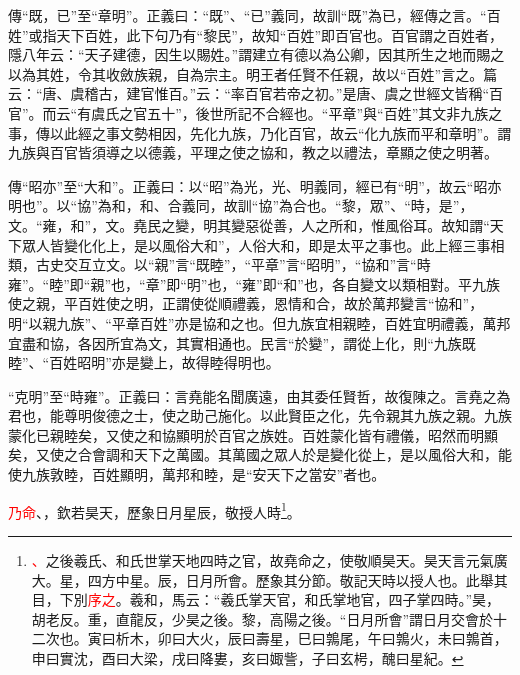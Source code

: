 {\noindent\zhuan{}\fzbyks 傳“既，已”至“章明”。正義曰：“既”、“已”義同，故訓“既”為已，經傳之言。“百姓”或指天下百姓，此下句乃有“黎民”，故知“百姓”即百官也。百官謂之百姓者，隱八年云：“天子建德，因生以賜姓。”謂建立有德以為公卿，因其所生之地而賜之以為其姓，令其收斂族親，自為宗主。明王者任賢不任親，故以“百姓”言之。篇云：“唐、虞稽古，建官惟百。”云：“率百官若帝之初。”是唐、虞之世經文皆稱“百官”。而云“有虞氏之官五十”，後世所記不合經也。“平章”與“百姓”其文非九族之事，傳以此經之事文勢相因，先化九族，乃化百官，故云“化九族而平和章明”。謂九族與百官皆須導之以德義，平理之使之協和，教之以禮法，章顯之使之明著。 \par}

{\noindent\zhuan{}\fzbyks 傳“昭亦”至“大和”。正義曰：以“昭”為光，光、明義同，經已有“明”，故云“昭亦明也”。以“協”為和，和、合義同，故訓“協”為合也。“黎，眾”、“時，是”，文。“雍，和”，文。堯民之變，明其變惡從善，人之所和，惟風俗耳。故知謂“天下眾人皆變化化上，是以風俗大和”，人俗大和，即是太平之事也。此上經三事相類，古史交互立文。以“親”言“既睦”，“平章”言“昭明”，“協和”言“時雍”。“睦”即“親”也，“章”即“明”也，“雍”即“和”也，各自變文以類相對。平九族使之親，平百姓使之明，正謂使從順禮義，恩情和合，故於萬邦變言“協和”，明“以親九族”、“平章百姓”亦是協和之也。但九族宜相親睦，百姓宜明禮義，萬邦宜盡和協，各因所宜為文，其實相通也。民言“於變”，謂從上化，則“九族既睦”、“百姓昭明”亦是變上，故得睦得明也。 \par}

{\noindent\shu{}\fzkt “克明”至“時雍”。正義曰：言堯能名聞廣遠，由其委任賢哲，故復陳之。言堯之為君也，能尊明俊德之士，使之助己施化。以此賢臣之化，先令親其九族之親。九族蒙化已親睦矣，又使之和協顯明於百官之族姓。百姓蒙化皆有禮儀，昭然而明顯矣，又使之合會調和天下之萬國。其萬國之眾人於是變化從上，是以風俗大和，能使九族敦睦，百姓顯明，萬邦和睦，是“安天下之當安”者也。 \par}

\textcolor{red}{乃命}、，欽若昊天，歷象日月星辰，敬授人時\footnote{\textcolor{red}{、}之後羲氏、和氏世掌天地四時之官，故堯命之，使敬順昊天。昊天言元氣廣大。星，四方中星。辰，日月所會。歷象其分節。敬記天時以授人也。此舉其目，下別\textcolor{red}{序之}。羲和，馬云：“羲氏掌天官，和氏掌地官，四子掌四時。”昊，胡老反。重，直龍反，少昊之後。黎，高陽之後。“日月所會”謂日月交會於十二次也。寅曰析木，卯曰大火，辰曰壽星，巳曰鶉尾，午曰鶉火，未曰鶉首，申曰實沈，酉曰大梁，戌曰降婁，亥曰娵訾，子曰玄枵，醜曰星紀。}。

